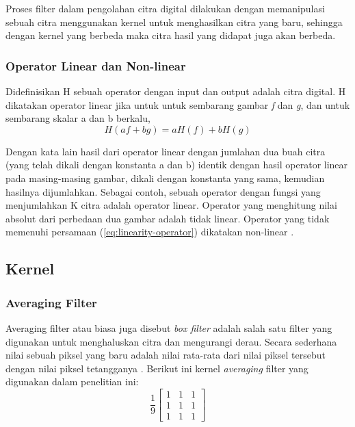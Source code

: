 Proses filter dalam pengolahan citra digital dilakukan dengan memanipulasi sebuah citra menggunakan kernel untuk menghasilkan citra yang baru, sehingga dengan kernel yang berbeda maka citra hasil yang didapat juga akan berbeda. 


\subsubsection{Operator Linear dan Non-linear}
Didefinisikan H sebuah operator dengan input dan output adalah citra digital. H dikatakan operator linear jika untuk untuk sembarang gambar \textit{f} dan \textit{g}, dan untuk sembarang skalar a dan b berkalu,
\begin{equation}
    \label{eq:linearity-operator}
    H(af + bg) = aH(f) + bH(g)
\end{equation}

Dengan kata lain hasil dari operator linear dengan jumlahan dua buah citra (yang telah dikali dengan konstanta a dan b) identik dengan hasil operator linear pada masing-masing gambar, dikali dengan konstanta yang sama, kemudian hasilnya dijumlahkan. Sebagai contoh, sebuah operator dengan fungsi yang menjumlahkan K citra adalah operator linear. Operator yang menghitung nilai absolut dari perbedaan dua gambar adalah tidak linear. Operator yang tidak memenuhi persamaan (\ref{eq:linearity-operator}) dikatakan non-linear .


\subsection{Kernel}

\subsubsection{Averaging Filter}
Averaging filter atau biasa juga disebut \textit{box filter} adalah salah satu filter yang digunakan untuk menghaluskan citra dan mengurangi derau. Secara sederhana nilai sebuah piksel yang baru adalah nilai rata-rata dari nilai piksel tersebut dengan nilai piksel tetangganya . Berikut ini kernel \textit{averaging} filter yang digunakan dalam penelitian ini:
\begin{equation*}
    \label{kernel:average}
    \frac{1}{9} \left[
    \begin{matrix}
        1 & 1 & 1 \\
        1 & 1 & 1 \\
        1 & 1 & 1
    \end{matrix}
    \right]
\end{equation*}

